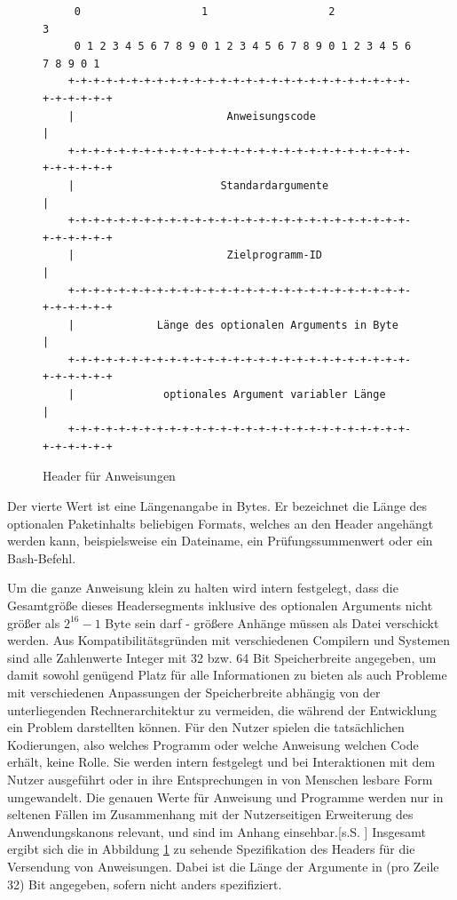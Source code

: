\begin{figure}[h]
\begin{lstlisting}
     0                   1                   2                   3
     0 1 2 3 4 5 6 7 8 9 0 1 2 3 4 5 6 7 8 9 0 1 2 3 4 5 6 7 8 9 0 1
    +-+-+-+-+-+-+-+-+-+-+-+-+-+-+-+-+-+-+-+-+-+-+-+-+-+-+-+-+-+-+-+-+
    |                        Anweisungscode                         |
    +-+-+-+-+-+-+-+-+-+-+-+-+-+-+-+-+-+-+-+-+-+-+-+-+-+-+-+-+-+-+-+-+
    |                       Standardargumente                       |
    +-+-+-+-+-+-+-+-+-+-+-+-+-+-+-+-+-+-+-+-+-+-+-+-+-+-+-+-+-+-+-+-+
    |                        Zielprogramm-ID                        |
    +-+-+-+-+-+-+-+-+-+-+-+-+-+-+-+-+-+-+-+-+-+-+-+-+-+-+-+-+-+-+-+-+
    |             Länge des optionalen Arguments in Byte            |
    +-+-+-+-+-+-+-+-+-+-+-+-+-+-+-+-+-+-+-+-+-+-+-+-+-+-+-+-+-+-+-+-+
    |              optionales Argument variabler Länge              |
    +-+-+-+-+-+-+-+-+-+-+-+-+-+-+-+-+-+-+-+-+-+-+-+-+-+-+-+-+-+-+-+-+
\end{lstlisting}
\caption{Header für Anweisungen}
\label{Anweisungs_Header}
\end{figure}

Der vierte Wert ist eine Längenangabe in Bytes.
Er bezeichnet die Länge des optionalen Paketinhalts beliebigen Formats, welches an den Header angehängt werden kann, beispielsweise ein Dateiname, ein Prüfungssummenwert oder ein Bash-Befehl.\par
Um die ganze Anweisung klein zu halten wird intern festgelegt, dass die Gesamtgröße dieses Headersegments inklusive des optionalen Arguments nicht größer als $2^{16}-1$ Byte sein darf - größere Anhänge müssen als Datei verschickt werden.
Aus Kompatibilitätsgründen mit verschiedenen Compilern und Systemen sind alle Zahlenwerte Integer mit 32 bzw. 64 Bit Speicherbreite angegeben, um damit sowohl genügend Platz für alle Informationen zu bieten als auch Probleme mit verschiedenen Anpassungen der Speicherbreite abhängig von der unterliegenden Rechnerarchitektur zu vermeiden, die während der Entwicklung ein Problem darstellten können.
Für den Nutzer spielen die tatsächlichen Kodierungen, also welches Programm oder welche Anweisung welchen Code erhält, keine Rolle. Sie werden intern festgelegt und bei  Interaktionen mit dem Nutzer ausgeführt oder in ihre Entsprechungen in von Menschen lesbare Form umgewandelt.
Die genauen Werte für Anweisung und Programme werden nur in seltenen Fällen im Zusammenhang mit der Nutzerseitigen Erweiterung des Anwendungskanons relevant, und sind im Anhang einsehbar.[s.S. \pageref{enums}]
Insgesamt ergibt sich die in Abbildung \ref{Anweisungs_Header} zu sehende Spezifikation des Headers für die Versendung von Anweisungen.
Dabei ist die Länge der Argumente in (pro Zeile 32) Bit angegeben, sofern nicht anders spezifiziert.\\\\

